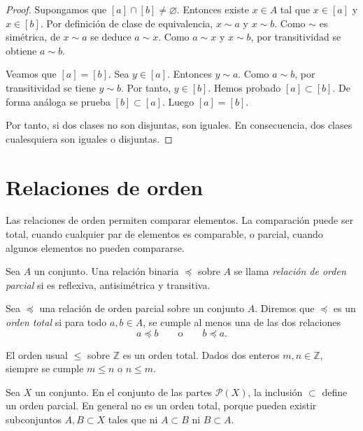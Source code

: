 \begin{proof}
Supongamos que \([a]\cap[b]\ne\varnothing\). Entonces existe \(x\in A\) tal que \(x\in[a]\) y \(x\in[b]\). Por definición de clase de equivalencia, \(x\sim a\) y \(x\sim b\). Como \(\sim\) es simétrica, de \(x\sim a\) se deduce \(a\sim x\). Como \(a\sim x\) y \(x\sim b\), por transitividad se obtiene \(a\sim b\).

Veamos que \([a]=[b]\). Sea \(y\in[a]\). Entonces \(y\sim a\). Como \(a\sim b\), por transitividad se tiene \(y\sim b\). Por tanto, \(y\in[b]\). Hemos probado \([a]\subset[b]\). De forma análoga se prueba \([b]\subset[a]\). Luego \([a]=[b]\).

Por tanto, si dos clases no son disjuntas, son iguales. En consecuencia, dos clases cualesquiera son iguales o disjuntas.
\end{proof}

\section{Relaciones de orden}

Las relaciones de orden permiten comparar elementos. La comparación puede ser total, cuando cualquier par de elementos es comparable, o parcial, cuando algunos elementos no pueden compararse.

\begin{definicion}
Sea \(A\) un conjunto. Una relación binaria \(\preceq\) sobre \(A\) se llama \emph{relación de orden parcial} si es reflexiva, antisimétrica y transitiva.
\end{definicion}

\begin{definicion}
Sea \(\preceq\) una relación de orden parcial sobre un conjunto \(A\). Diremos que \(\preceq\) es un \emph{orden total} si para todo \(a,b\in A\), se cumple al menos una de las dos relaciones
\[
a\preceq b
\qquad\text{o}\qquad
b\preceq a.
\]
\end{definicion}

\begin{ejemplo}
El orden usual \(\leq\) sobre \(\mathbb{Z}\) es un orden total. Dados dos enteros \(m,n\in\mathbb{Z}\), siempre se cumple \(m\leq n\) o \(n\leq m\).
\end{ejemplo}

\begin{ejemplo}
Sea \(X\) un conjunto. En el conjunto de las partes \(\mathcal{P}(X)\), la inclusión \(\subset\) define un orden parcial. En general no es un orden total, porque pueden existir subconjuntos \(A,B\subset X\) tales que ni \(A\subset B\) ni \(B\subset A\).
\end{ejemplo}

